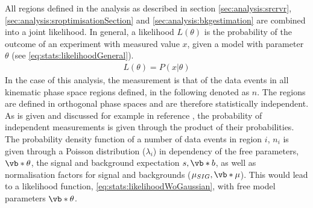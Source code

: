 %

All regions defined in the analysis as described in section \ref{sec:analysis:srcrvr}, \ref{sec:analysis:sroptimisationSection} and \ref{sec:analysis:bkgestimation} are combined into a joint likelihood. 
In general,  a likelihood $L(\theta)$ is the probability of the outcome of an experiment with measured value $x$,  given a model with parameter $\theta$ (see \eqref{eq:stats:likelihoodGeneral}).
\begin{align}
L(\theta) = P(x|\theta) \label{eq:stats:likelihoodGeneral}
\end{align}
In the case of this analysis, the measurement is that of the data events in all kinematic phase space regions defined,  in the following denoted as $n$.  The regions are defined in orthogonal phase spaces and are therefore statistically independent.  As is given and discussed for example in reference \cite{Cowan},  the probability of independent measurements is given through the product of their probabilities. 
The probability density function of a number of data events in region $i$,  $n_i$ is given through a Poisson distribution ($\lambda_i$) in dependency of the free parameters,  $\vb*{\theta}$,  the signal and background expectation $s,\vb*{b}$, as well as normalisation factors for signal and backgrounds ($\mu_{SIG},  \vb*{\mu}$).
This would lead to a likelihood function,  \eqref{eq:stats:likelihoodWoGaussian},  with free model parameters $\vb*{\theta}$.

